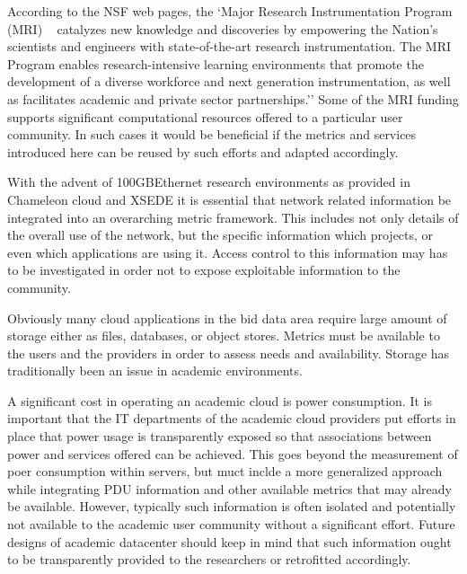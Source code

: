 \documentclass{sig-alternate-05-2015}
\begin{document}
\begin{description}
\setlength\itemsep{-2pt}

\item[\it MRIs.] According to the NSF web pages, the `Major Research
  Instrumentation Program (MRI) ~\cite{nsf-mri}  catalyzes new knowledge and
  discoveries by empowering the Nation's scientists and engineers with
  state-of-the-art research instrumentation. The MRI Program enables
  research-intensive learning environments that promote the
  development of a diverse workforce and next generation
  instrumentation, as well as facilitates academic and private sector
  partnerships.'' Some of the MRI funding supports significant
  computational resources offered to a particular user community. In
  such cases it would be beneficial if the metrics and services
  introduced here can be reused by such efforts and adapted
  accordingly. 

\item[\it Networks.] With the advent of 100GBEthernet research
  environments as provided in Chameleon cloud and XSEDE it is
  essential that network related information be integrated into an
  overarching metric framework. This includes not only details of the
  overall use of the network, but the specific information which
  projects, or even which applications are using it. Access control to
  this information may has to be investigated in order not to expose
  exploitable information to the community.

\item[\it Storage.] Obviously many cloud applications in the bid data
  area require large amount of storage either as files, databases, or
  object stores. Metrics must be available to the users and the
  providers in order to assess needs and availability. Storage has
  traditionally been an issue in academic environments.

\item[\it Power.] A significant cost in operating an academic cloud is
  power consumption. It is important that the IT departments of the
  academic cloud providers put efforts in place that power usage is
  transparently exposed so that associations between power and
  services offered can be achieved. This goes beyond the measurement
  of poer consumption within servers, but muct inclde a more
  generalized approach while integrating PDU information and other
  available metrics that may already be available. However, typically
  such information is often isolated and potentially not available to
  the academic user community without a significant effort. Future
  designs of academic datacenter should keep in mind that such
  information ought to be transparently provided to the researchers or
  retrofitted accordingly.


\end{description}
\end{document}
